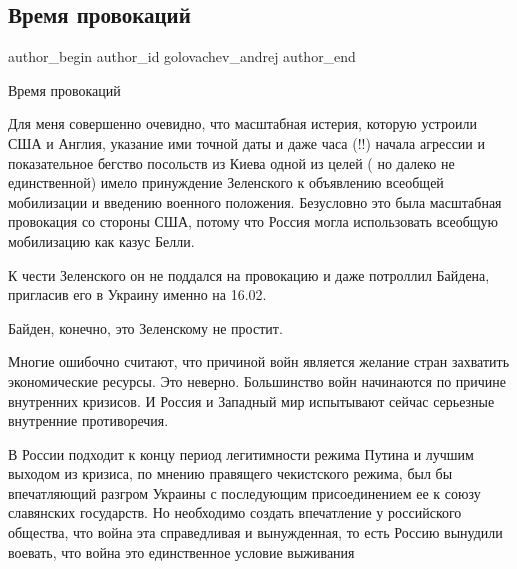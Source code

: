  
 
 
 
 
 
\subsection{Время провокаций}
\label{sec:16_02_2022.fb.golovachev_andrej.1.vremja_provokacij}
 
\ifcmt
 author_begin
   author_id golovachev_andrej
 author_end
\fi

Время провокаций

Для меня совершенно очевидно, что масштабная истерия, которую устроили США и
Англия, указание ими  точной даты и  даже часа (!!) начала агрессии и
показательное бегство посольств из Киева одной из целей ( но  далеко не
единственной) имело принуждение Зеленского к объявлению всеобщей мобилизации и
введению военного положения. Безусловно это была масштабная провокация со
стороны США, потому что Россия могла использовать всеобщую мобилизацию как
казус Белли.

К чести Зеленского  он   не поддался на провокацию и даже потроллил
Байдена, пригласив его в Украину именно на 16.02.

Байден, конечно, это Зеленскому не простит.

Многие ошибочно считают, что причиной войн является желание стран захватить
экономические ресурсы. Это неверно. Большинство войн начинаются по причине
внутренних кризисов. И Россия и Западный мир испытывают сейчас серьезные
внутренние противоречия.

В России подходит к концу период легитимности режима Путина и лучшим выходом из
кризиса, по мнению правящего чекистского режима, был бы впечатляющий разгром
Украины  с последующим присоединением ее к союзу славянских государств.   Но
необходимо создать впечатление у российского общества, что война эта
справедливая и вынужденная, то есть Россию вынудили воевать, что война это
единственное условие выживания  


